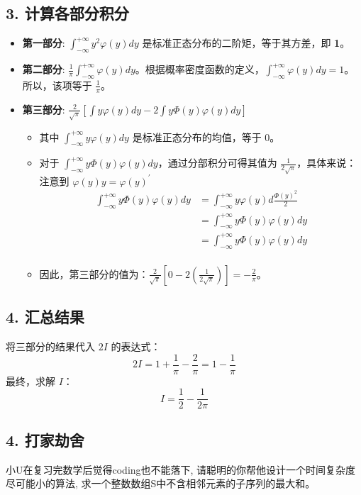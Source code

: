 \documentclass[UTF8]{ctexart}
\begin{document}
\subsection*{3. 计算各部分积分}
\begin{itemize}
    \item \textbf{第一部分}: $\int_{-\infty}^{+\infty} y^2 \varphi(y)dy$ 是标准正态分布的二阶矩，等于其方差，即 \textbf{1}。
    \item \textbf{第二部分}: $\frac{1}{\pi}\int_{-\infty}^{+\infty}\varphi(y)dy$。根据概率密度函数的定义，$\int_{-\infty}^{+\infty}\varphi(y)dy=1$。所以，该项等于 \textbf{$\frac{1}{\pi}$}。
    \item \textbf{第三部分}: $\frac{2}{\sqrt{\pi}} \left[ \int y\varphi(y)dy - 2\int y\Phi(y)\varphi(y)dy \right]$
        \begin{itemize}
            \item 其中 $\int_{-\infty}^{+\infty} y\varphi(y)dy$ 是标准正态分布的均值，等于 0。
            \item 对于 $\int_{-\infty}^{+\infty} y\Phi(y)\varphi(y)dy$，通过分部积分可得其值为 $\frac{1}{2\sqrt{\pi}}$，具体来说：注意到
            $\varphi(y) y=\varphi(y)^'$
            \begin{align*}
                \int_{-\infty}^{+\infty} y\Phi(y)\varphi(y)dy 
                &= \int_{-\infty}^{+\infty} y\varphi(y)d\frac{\Phi(y)^2}{2} \\
                &= \int_{-\infty}^{+\infty} y\Phi(y)\varphi(y)dy \\
                &= \int_{-\infty}^{+\infty} y\Phi(y)\varphi(y)dy \\ 
            \end{align*}
            \item 因此，第三部分的值为：$\frac{2}{\sqrt{\pi}} \left[ 0 - 2 \left( \frac{1}{2\sqrt{\pi}} \right) \right] = -\frac{2}{\pi}$。
        \end{itemize}
\end{itemize}

\subsection*{4. 汇总结果}
将三部分的结果代入 $2I$ 的表达式：
$$ 2I = 1 + \frac{1}{\pi} - \frac{2}{\pi} = 1 - \frac{1}{\pi} $$
最终，求解 $I$：
$$ I = \frac{1}{2} - \frac{1}{2\pi} $$

\subsection*{4. 打家劫舍}
小U在复习完数学后觉得coding也不能落下, 请聪明的你帮他设计一个时间复杂度尽可能小的算法, 求一个整数数组S中不含相邻元素的子序列的最大和。
\end{document}
